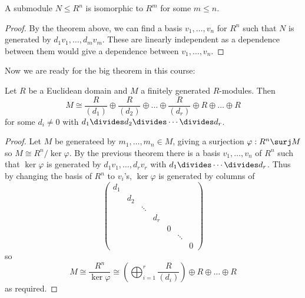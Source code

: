 \documentclass[a4paper]{article}
\theoremstyle{definition}
\begin{document}
\begin{corollary}
  A submodule \(N \leq R^n\) is isomorphic to \(R^m\) for some \(m \leq n\).
\end{corollary}

\begin{proof}
  By the theorem above, we can find a basis \(v_1, \dots, v_n\) for \(R^n\) such that \(N\) is generated by \(d_1v_1, \dots, d_mv_m\). These are linearly independent as a dependence between them would give a dependence between \(v_1, \dots, v_n\).
\end{proof}

Now we are ready for the big theorem in this course:

\begin{theorem}
  \label{thm:module over ED}
  Let \(R\) be a Euclidean domain and \(M\) a finitely generated \(R\)-modules. Then
  \[
    M \cong \frac{R}{(d_1)} \oplus \frac{R}{(d_2)} \oplus \dots \oplus \frac{R}{(d_r)} \oplus R \oplus \dots \oplus R
  \]
  for some \(d_i \neq 0\) with \(d_1 \divides d_2 \divides \cdots \divides d_r\).
\end{theorem}

\begin{proof}
  Let \(M\) be generateed by \(m_1, \dots, m_n \in M\), giving a surjection \(\varphi: R^n \surj M\) so \(M \cong R^n/\ker \varphi\). By the previous theorem there is a basis \(v_1, \dots, v_n\) of \(R^n\) such that \(\ker \varphi\) is generated by \(d_1v_1, \dots, d_rv_r\) with \(d_1 \divides \cdots \divides d_r\). Thus by changing the basis of \(R^n\) to \(v_i\)'s, \(\ker \varphi\) is generated by columns of
  \[
    \begin{pmatrix}
      d_1 \\
      & d_2 \\
      & & \ddots \\
      & & & d_r \\
      & & & & 0 \\
      & & & & & \ddots \\
      & & & & & & 0
    \end{pmatrix}
  \]
  so
  \[
    M \cong \frac{R^n}{\ker \varphi} \cong \left( \bigoplus_{i = 1}^r \frac{R}{(d_i)} \right) \oplus R \oplus \dots \oplus R
  \]
  as required.
\end{proof}
\end{document}
